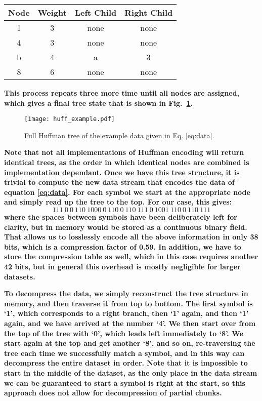 \documentclass[twocolumn]{aa}
\begin{document}
\begin{table}[H]
\centering
\begin{tabular}{| c | c | c | c |}
\hline
Node & Weight & Left Child & Right Child\\
\hline
1 & 3 & none & none\\
4 & 3 & none & none\\
b & 4 & a & 3\\
8 & 6 & none & none\\
\hline
\end{tabular}
\end{table}
\textbf{This process repeats three more time until all nodes are assigned, which gives a final tree state that is shown in Fig.~\ref{fig:huffexample}}. 
\begin{figure}[t]
  \center
  \texttt{[image: huff\_example.pdf]}
  \caption{Full Huffman tree of the example data given in Eq. \ref{eq:data}.
  }\label{fig:huffexample}
\end{figure}
\textbf{Note that not all implementations of Huffman encoding will return identical trees, as the order in which identical nodes are combined is implementation dependant.}
\textbf{Once we have this tree structure, it is trivial to compute the new data stream that encodes the data of equation \ref{eq:data}. For each symbol we start at the appropriate node and simply read up the tree to the top. For our case, this gives:}
\begin{equation}
111\ 0\ 0\ 110\ 1000\ 0\ 110\ 0\ 110\ 111\ 0\ 1001\ 110\ 0\ 110\ 111
\label{eq:encoding}
\end{equation}
\textbf{where the spaces between symbols have been deliberately left for clarity, but in memory would be stored as a continuous binary field. That allows us to losslessly encode all the above information in only 38 bits, which is a compression factor of 0.59. In addition, we have to store the compression table as well, which in this case requires another 42 bits, but in general this overhead is mostly negligible for larger datasets.}

\textbf{To decompress the data, we simply reconstruct the tree structure in memory, and then traverse it from top to bottom. The first symbol is `1', which corresponds to a right branch, then `1' again, and then `1' again, and we have arrived at the number `4'. We then start over from the top of the tree with `0', which leads left immediately to `8'. We start again at the top and get another `8', and so on, re-traversing the tree each time we successfully match a symbol, and in this way can decompress the entire dataset in order. Note that it is impossible to start in the middle of the dataset, as the only place in the data stream we can be guaranteed to start a symbol is right at the start, so this approach does not allow for decompression of partial chunks.}






\end{document}
